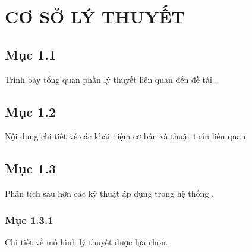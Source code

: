 \chapter{CƠ SỞ LÝ THUYẾT}

\section{Mục 1.1}
Trình bày tổng quan phần lý thuyết liên quan đến đề tài \cite{ref1}.

\section{Mục 1.2}
Nội dung chi tiết về các khái niệm cơ bản và thuật toán liên quan.

\section{Mục 1.3}
Phân tích sâu hơn các kỹ thuật áp dụng trong hệ thống \cite{ref2}.

\subsection{Mục 1.3.1}
Chi tiết về mô hình lý thuyết được lựa chọn.
